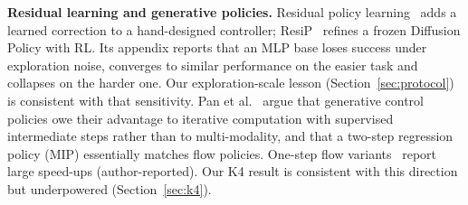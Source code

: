 \textbf{Residual learning and generative policies.} Residual policy learning~\cite{silver2018residual,johannink2018residual} adds a learned correction to a hand-designed controller; ResiP~\cite{ankile2024resip} refines a frozen Diffusion Policy with RL. Its appendix reports that an MLP base loses success under exploration noise, converges to similar performance on the easier task and collapses on the harder one. Our exploration-scale lesson (Section~\ref{sec:protocol}) is consistent with that sensitivity. Pan et al.~\cite{pan2025noising} argue that generative control policies owe their advantage to iterative computation with supervised intermediate steps rather than to multi-modality, and that a two-step regression policy (MIP) essentially matches flow policies. One-step flow variants~\cite{li2026ofp,wu2026cola} report large speed-ups (author-reported). Our K4 result is consistent with this direction but underpowered (Section~\ref{sec:k4}).

